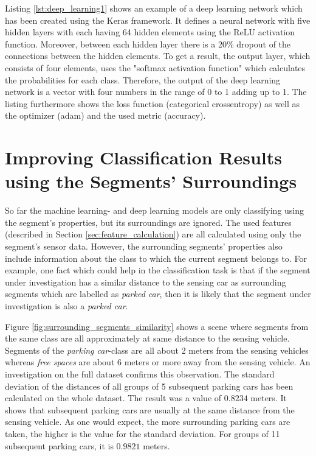 Listing \ref{lst:deep_learning1} shows an example of a deep learning network which has been created using the Keras framework. It defines a neural network with five hidden layers with each having 64 hidden elements using the ReLU activation function. Moreover, between each hidden layer there is a 20\% dropout of the connections between the hidden elements. To get a result, the output layer, which consists of four elements, uses the "softmax activation function" which calculates the probabilities for each class. Therefore, the output of the deep learning network is a vector with four numbers in the range of 0 to 1 adding up to 1. The listing furthermore shows the loss function (categorical crossentropy) as well as the optimizer (adam) and the used metric (accuracy).











\section{Improving Classification Results using the Segments' Surroundings}
\label{sec:improv_classification_surrounding_segments}

So far the machine learning- and deep learning models are only classifying using the segment's properties, but its surroundings are ignored. The used features (described in Section \ref{sec:feature_calculation}) are all calculated using only the segment's sensor data. However, the surrounding segments' properties also include information about the class to which the current segment belongs to. 
For example, one fact which could help in the classification task is that if the segment under investigation has a similar distance to the sensing car as surrounding segments which are labelled as \emph{parked car}, then it is likely that the segment under investigation is also a \emph{parked car}. 

Figure \ref{fig:surrounding_segments_similarity} shows a scene where segments from the same class are all approximately at same distance to the sensing vehicle. Segments of the \emph{parking car}-class are all about 2 meters from the sensing vehicles whereas \emph{free spaces} are about 6 meters or more away from the sensing vehicle. An investigation on the full dataset confirms this observation. The standard deviation of the distances of all groups of 5 subsequent parking cars has been calculated on the whole dataset. The result was a value of $0.8234$ meters. It shows that subsequent parking cars are usually at the same distance from the sensing vehicle. As one would expect, the more surrounding parking cars are taken, the higher is the value for the standard deviation. For groups of 11 subsequent parking cars, it is $0.9821$ meters.

